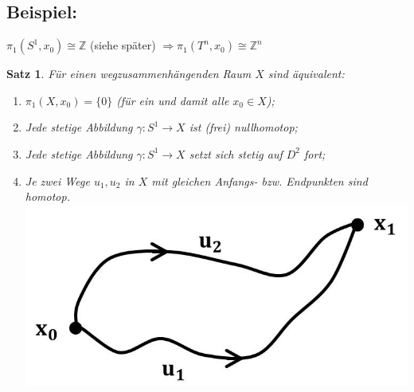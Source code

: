 \documentclass[a4paper,11pt,notitlepage]{report}
\newtheorem{theorem}{Satz}[chapter]
\theoremstyle{remark}
\theoremstyle{definition}
\newcommand{\Z}{{\ensuremath{\mathbb{Z}}}}
\newenvironment{bsp}[1]
{
\setlength{\fboxsep}{10pt}
\subsection*{Beispiel: #1}
\begin{upshape}
}
{
\end{upshape}
}
\begin{document}
\begin{bsp}{}
	$\pi_1(S^1,x_0) \cong \Z$ (siehe später) \newline
	$\Rightarrow \pi_1(T^n, x_0) \cong \Z^n$
\end{bsp}

\begin{theorem}
	Für einen wegzusammenhängenden Raum $X$ sind äquivalent:
	\begin{enumerate}
		\item $\pi_1(X,x_0) = \{0\}$ (für ein und damit alle $x_0 \in X$);
		\item Jede stetige Abbildung $\gamma \colon S^1 \rightarrow X$ ist (frei) nullhomotop;
		\item Jede stetige Abbildung $\gamma \colon S^1 \rightarrow X$ setzt sich stetig auf $D^2$ fort; %
		\item Je zwei Wege $u_1, u_2$ in $X$ mit gleichen Anfangs- bzw. Endpunkten sind homotop. \newline
		\includegraphics[scale=0.4]{images/Wege_homotop.jpg}
	\end{enumerate}
\end{theorem}
\end{document}
